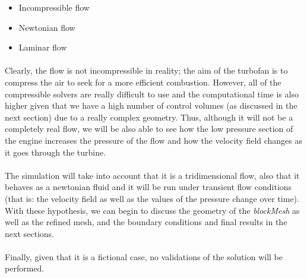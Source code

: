 \begin{itemize}
	\item Incompressible flow
	\item Newtonian flow
	\item Laminar flow
\end{itemize}

\paragraph{}Clearly, the flow is not incompressible in reality; the aim of the turbofan is to compress the air to seek for a more efficient combustion. However, all of the compressible solvers are really difficult to use and the computational time is also higher given that we have a high number of control volumes (as discussed in the next section) due to a really complex geometry. Thus, although it will not be a completely real flow, we will be also able to see how the low pressure section of the engine increases the pressure of the flow and how the velocity field changes as it goes through the turbine.

\paragraph{}The simulation will take into account that it is a tridimensional flow, also that it behaves as a newtonian fluid and it will be run under transient flow conditions (that is: the velocity field as well as the values of the pressure change over time). With these hypothesis, we can begin to discuss the geometry of the \textit{blockMesh} as well as the refined mesh, and the boundary conditions and final results in the next sections.

\paragraph{}Finally, given that it is a fictional case, no validations of the solution will be performed.